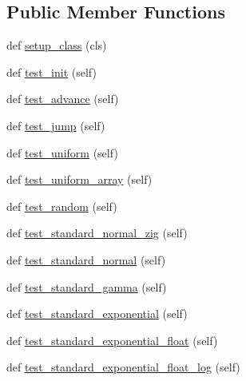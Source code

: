 \subsection*{Public Member Functions}
\begin{DoxyCompactItemize}
\item 
def \hyperlink{classnumpy_1_1random_1_1tests_1_1test__smoke_1_1RNG_aade2896f4fcce94a3f675e3289a7b175}{setup\+\_\+class} (cls)
\item 
def \hyperlink{classnumpy_1_1random_1_1tests_1_1test__smoke_1_1RNG_a1430a8fe3e67a61f132daf1c0e24278c}{test\+\_\+init} (self)
\item 
def \hyperlink{classnumpy_1_1random_1_1tests_1_1test__smoke_1_1RNG_aa1e0b64717e9f909da7a4b137a3ef6d6}{test\+\_\+advance} (self)
\item 
def \hyperlink{classnumpy_1_1random_1_1tests_1_1test__smoke_1_1RNG_af48a4afb77e26cd7ad6d01d3a410f94e}{test\+\_\+jump} (self)
\item 
def \hyperlink{classnumpy_1_1random_1_1tests_1_1test__smoke_1_1RNG_a8ae7cb18b4caabaa361d26d5d1697745}{test\+\_\+uniform} (self)
\item 
def \hyperlink{classnumpy_1_1random_1_1tests_1_1test__smoke_1_1RNG_a9d01ea7160b60550a95209b8060d83e9}{test\+\_\+uniform\+\_\+array} (self)
\item 
def \hyperlink{classnumpy_1_1random_1_1tests_1_1test__smoke_1_1RNG_afdabbbf9a840a89e3495ada796a50e45}{test\+\_\+random} (self)
\item 
def \hyperlink{classnumpy_1_1random_1_1tests_1_1test__smoke_1_1RNG_a7192ef0e2919754bc1622af5b71930e8}{test\+\_\+standard\+\_\+normal\+\_\+zig} (self)
\item 
def \hyperlink{classnumpy_1_1random_1_1tests_1_1test__smoke_1_1RNG_a9827fc57ab7ab1e283b70fb868e6d27d}{test\+\_\+standard\+\_\+normal} (self)
\item 
def \hyperlink{classnumpy_1_1random_1_1tests_1_1test__smoke_1_1RNG_aa446b541eec89527343c93049c8d44f0}{test\+\_\+standard\+\_\+gamma} (self)
\item 
def \hyperlink{classnumpy_1_1random_1_1tests_1_1test__smoke_1_1RNG_ac848f2ae332a8b3db96b6c4bfce731cd}{test\+\_\+standard\+\_\+exponential} (self)
\item 
def \hyperlink{classnumpy_1_1random_1_1tests_1_1test__smoke_1_1RNG_ac2d2a352457c75efb90a21dde37ad52d}{test\+\_\+standard\+\_\+exponential\+\_\+float} (self)
\item 
def \hyperlink{classnumpy_1_1random_1_1tests_1_1test__smoke_1_1RNG_a945ab4bd999249a1d2910f8001b97f5e}{test\+\_\+standard\+\_\+exponential\+\_\+float\+\_\+log} (self)

\end{DoxyCompactItemize}
